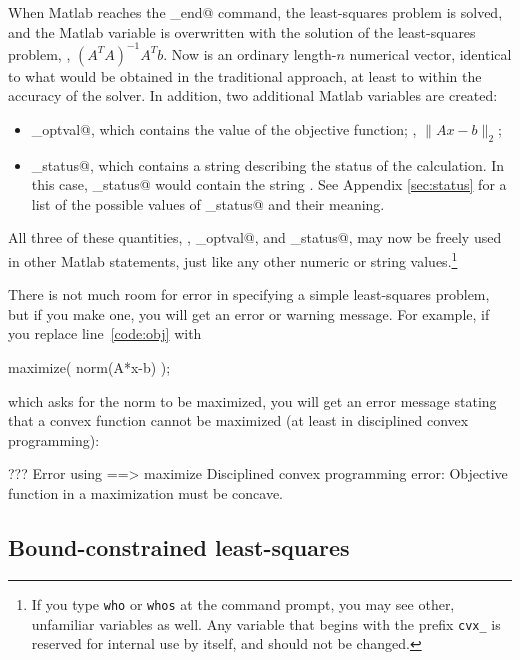 \documentclass[12pt]{article}
\begin{document}
When Matlab reaches the \verb@cvx_end@ command, the least-squares
problem is solved,
and the Matlab variable \verb@x@ is overwritten
with the solution of the least-squares problem, \ie, $(A^TA)^{-1}A^Tb$.
Now \verb@x@ is an ordinary length-$n$ numerical vector, identical
to what would be obtained in the traditional approach, at least to
within the accuracy of the solver. In addition, two additional Matlab
variables are created:
\begin{itemize}
\item \verb@cvx_optval@, which contains the value of the objective
function; \ie, $\|Ax-b\|_2$;
\item \verb@cvx_status@, which contains a string describing the
status of the calculation. In this case, \verb@cvx_status@
would contain the string \verb@Solved@. See Appendix \ref{sec:status}
for a list of the possible values of \verb@cvx_status@ and their meaning.
\end{itemize}
All three of these quantities, \verb@x@, \verb@cvx_optval@, and
\verb@cvx_status@, may now be freely used in other Matlab
statements, just like any other numeric or string values.\footnote{If you type
\texttt{who} or \texttt{whos} at the command prompt, you may see other, unfamiliar
variables as well. Any variable that begins with the prefix \texttt{cvx\_} is 
reserved for internal use by \cvx itself, and should not be changed.}

There is not much room for error in specifying a simple least-squares
problem, but if you make one, you will get an error or warning message.
For example, if you replace line~\ref{code:obj} with
\begin{code}
	maximize( norm(A*x-b) );
\end{code}
which asks for the norm to be maximized, you will get an error message
stating that a convex function cannot be maximized (at least in
disciplined convex programming):
\begin{code}
??? Error using ==> maximize
Disciplined convex programming error:
Objective function in a maximization must be concave.
\end{code}

\subsection{Bound-constrained least-squares}
\label{sec:bcls}
\label{Least squares!Bound-constrained}
\label{Bound-constrained least squares}
\end{document}
